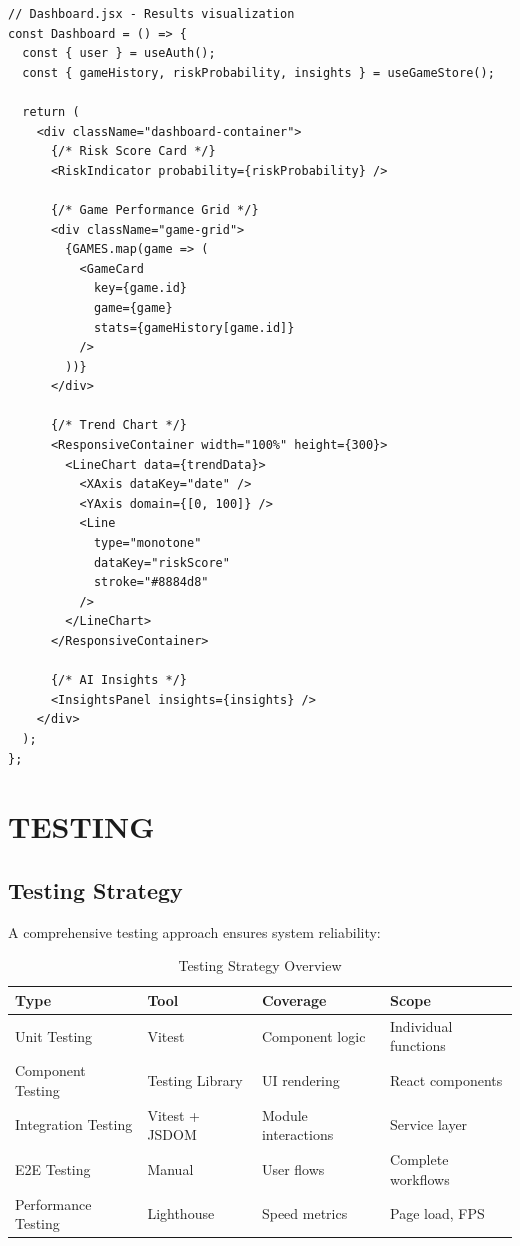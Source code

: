 \documentclass[12pt,letterpaper]{article}
\begin{document}
\begin{verbatim}
// Dashboard.jsx - Results visualization
const Dashboard = () => {
  const { user } = useAuth();
  const { gameHistory, riskProbability, insights } = useGameStore();
  
  return (
    <div className="dashboard-container">
      {/* Risk Score Card */}
      <RiskIndicator probability={riskProbability} />
      
      {/* Game Performance Grid */}
      <div className="game-grid">
        {GAMES.map(game => (
          <GameCard 
            key={game.id}
            game={game}
            stats={gameHistory[game.id]}
          />
        ))}
      </div>
      
      {/* Trend Chart */}
      <ResponsiveContainer width="100%" height={300}>
        <LineChart data={trendData}>
          <XAxis dataKey="date" />
          <YAxis domain={[0, 100]} />
          <Line 
            type="monotone" 
            dataKey="riskScore" 
            stroke="#8884d8" 
          />
        </LineChart>
      </ResponsiveContainer>
      
      {/* AI Insights */}
      <InsightsPanel insights={insights} />
    </div>
  );
};
\end{verbatim}

\newpage


\section{TESTING}

\subsection{Testing Strategy}

A comprehensive testing approach ensures system reliability:

\begin{table}[H]
\centering
\begin{tabular}{|l|l|l|l|}
\hline
\textbf{Type} & \textbf{Tool} & \textbf{Coverage} & \textbf{Scope} \\
\hline
Unit Testing & Vitest & Component logic & Individual functions \\
\hline
Component Testing & Testing Library & UI rendering & React components \\
\hline
Integration Testing & Vitest + JSDOM & Module interactions & Service layer \\
\hline
E2E Testing & Manual & User flows & Complete workflows \\
\hline
Performance Testing & Lighthouse & Speed metrics & Page load, FPS \\
\hline
\end{tabular}
\caption{Testing Strategy Overview}
\end{table}
\end{document}
